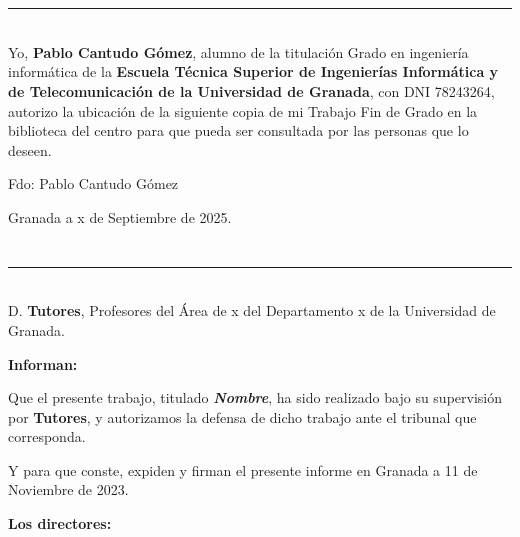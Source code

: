 \chapter*{}
\thispagestyle{empty}

\noindent\rule[-1ex]{\textwidth}{2pt}\\[4.5ex]

Yo, \textbf{Pablo Cantudo Gómez}, alumno de la titulación Grado en ingeniería informática de la \textbf{Escuela Técnica Superior
de Ingenierías Informática y de Telecomunicación de la Universidad de Granada}, con DNI 78243264, autorizo la
ubicación de la siguiente copia de mi Trabajo Fin de Grado en la biblioteca del centro para que pueda ser
consultada por las personas que lo deseen.

\vspace{6cm}

\noindent Fdo: Pablo Cantudo Gómez

\vspace{2cm}

\begin{flushright}
Granada a x de Septiembre de 2025.
\end{flushright}


\chapter*{}
\thispagestyle{empty}

\noindent\rule[-1ex]{\textwidth}{2pt}\\[4.5ex]

D. \textbf{Tutores}, Profesores del Área de x del Departamento x de la Universidad de Granada.

\vspace{0.5cm}

\textbf{Informan:}

\vspace{0.5cm}

Que el presente trabajo, titulado \textit{\textbf{Nombre}},
ha sido realizado bajo su supervisión por \textbf{Tutores}, y autorizamos la defensa de dicho trabajo ante el tribunal
que corresponda.

\vspace{0.5cm}

Y para que conste, expiden y firman el presente informe en Granada a 11 de Noviembre de 2023.

\vspace{1cm}

\textbf{Los directores:}

